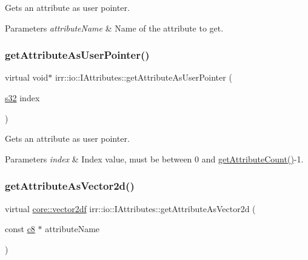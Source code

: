 Gets an attribute as user pointer. 


\begin{DoxyParams}{Parameters}
{\em attribute\+Name} & Name of the attribute to get. \\
\hline
\end{DoxyParams}
\mbox{\label{classirr_1_1io_1_1IAttributes_ae720da1bc66bc535ab839e95018d7398}} 
\subsubsection{\texorpdfstring{get\+Attribute\+As\+User\+Pointer()}{getAttributeAsUserPointer()}\hspace{0.1cm}{\footnotesize\ttfamily [2/2]}}
{\footnotesize\ttfamily virtual void$\ast$ irr\+::io\+::\+I\+Attributes\+::get\+Attribute\+As\+User\+Pointer (\begin{DoxyParamCaption}\item[{\hyperlink{namespaceirr_ac66849b7a6ed16e30ebede579f9b47c6}{s32}}]{index }\end{DoxyParamCaption})\hspace{0.3cm}{\ttfamily [pure virtual]}}



Gets an attribute as user pointer. 


\begin{DoxyParams}{Parameters}
{\em index} & Index value, must be between 0 and \hyperlink{classirr_1_1io_1_1IAttributes_a796bdd9440ee7ba0b6742a90a82870b6}{get\+Attribute\+Count()}-\/1. \\
\hline
\end{DoxyParams}
\mbox{\label{classirr_1_1io_1_1IAttributes_a047461734c2eb9e3f1b68a4278a0d24b}} 
\subsubsection{\texorpdfstring{get\+Attribute\+As\+Vector2d()}{getAttributeAsVector2d()}\hspace{0.1cm}{\footnotesize\ttfamily [1/2]}}
{\footnotesize\ttfamily virtual \hyperlink{namespaceirr_1_1core_a2cf08556d77f6f5a792973a6e27ed11b}{core\+::vector2df} irr\+::io\+::\+I\+Attributes\+::get\+Attribute\+As\+Vector2d (\begin{DoxyParamCaption}\item[{const \hyperlink{namespaceirr_a9395eaea339bcb546b319e9c96bf7410}{c8} $\ast$}]{attribute\+Name }\end{DoxyParamCaption})\hspace{0.3cm}{\ttfamily [pure virtual]}}




